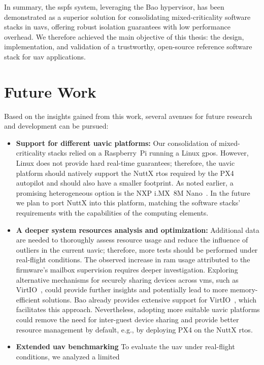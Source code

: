 In summary, the \gls{sspfs} system, leveraging the Bao hypervisor, has been
demonstrated as a superior solution for consolidating mixed-criticality software
stacks in \glspl{uav}, offering robust isolation guarantees with low performance
overhead. We therefore achieved the main objective of this thesis: the design,
implementation, and validation of a trustworthy, open-source reference software
stack for \gls{uav} applications.

\section{Future Work}
Based on the insights gained from this work, several
avenues for future research and development can be
pursued:
\begin{itemize}
\item \textbf{Support for different \gls{uavic} platforms:}
Our consolidation of mixed-criticality stacks relied on a Raspberry~Pi running a
Linux \gls{gpos}. However, Linux does not provide hard real-time guarantees;
therefore, the \gls{uavic} platform should natively support the NuttX \gls{rtos}
required by the PX4 autopilot and should also have a smaller footprint. As noted
earlier, a promising heterogeneous option is the NXP i.MX~8M Nano~\cite{imx8mn}.
In the future we plan to port NuttX into this platform,
matching the software stacks' requirements with the capabilities of the computing elements.
\item \textbf{A deeper system resources analysis and optimization:}
  Additional data are needed to thoroughly assess resource usage and reduce the
  influence of outliers in the current \gls{uavic}; therefore, more tests should
  be performed under real-flight conditions.
  The observed increase
  in \gls{ram} usage attributed to the firmware's mailbox supervision requires
  deeper investigation. Exploring alternative mechanisms for securely sharing
  devices across \glspl{vm}, such as VirtIO~\cite{peixoto-virtio-2024}, could provide further insights and
  potentially lead to more memory-efficient solutions. Bao already provides
  extensive support for
  VirtIO~\cite{costa2022virtio,ribeiro2023virtio,peixoto-virtio-2024,baoRepo},
  which facilitates this approach. Nevertheless, adopting more suitable
  \gls{uavic} platforms could remove the need for inter-guest device sharing and
  provide better resource management by default, e.g., by deploying PX4
  on the NuttX \gls{rtos}.
\item \textbf{Extended \gls{uav} benchmarking}
To evaluate the \gls{uav} under real-flight conditions, we analyzed a limited

\end{itemize}
